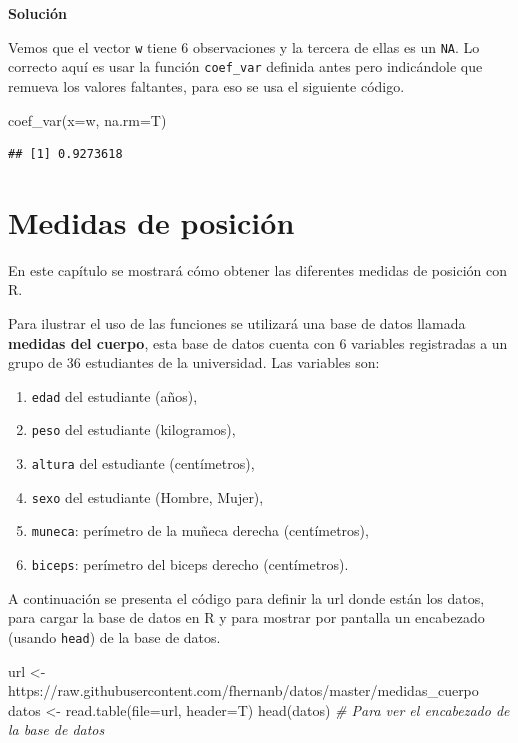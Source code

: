 \documentclass[
]{book}
\makeatletter
\newenvironment{Shaded}{\begin{snugshade}}{\end{snugshade}}
\newcommand{\AttributeTok}[1]{\textcolor[rgb]{0.77,0.63,0.00}{#1}}
\newcommand{\CommentTok}[1]{\textcolor[rgb]{0.56,0.35,0.01}{\textit{#1}}}
\newcommand{\FunctionTok}[1]{\textcolor[rgb]{0.00,0.00,0.00}{#1}}
\newcommand{\NormalTok}[1]{#1}
\newcommand{\OtherTok}[1]{\textcolor[rgb]{0.56,0.35,0.01}{#1}}
\newcommand{\StringTok}[1]{\textcolor[rgb]{0.31,0.60,0.02}{#1}}
\providecommand{\tightlist}{%
  \setlength{\itemsep}{0pt}\setlength{\parskip}{0pt}}
\newenvironment{kframe}{%
\medskip{}
\setlength{\fboxsep}{.8em}
 \def\at@end@of@kframe{}%
 \ifinner\ifhmode%
  \def\at@end@of@kframe{\end{minipage}}%
  \begin{minipage}{\columnwidth}%
 \fi\fi%
 \def\FrameCommand##1{\hskip\@totalleftmargin \hskip-\fboxsep
 \colorbox{shadecolor}{##1}\hskip-\fboxsep
     \hskip-\linewidth \hskip-\@totalleftmargin \hskip\columnwidth}%
 \MakeFramed {\advance\hsize-\width
   \@totalleftmargin\z@ \linewidth\hsize
   \@setminipage}}%
 {\par\unskip\endMakeFramed%
 \at@end@of@kframe}
\renewenvironment{Shaded}{\begin{kframe}}{\end{kframe}}
\makeatother
\begin{document}
\textbf{Solución}

Vemos que el vector \texttt{w} tiene 6 observaciones y la tercera de ellas es un \texttt{NA}. Lo correcto aquí es usar la función \texttt{coef\_var} definida antes pero indicándole que remueva los valores faltantes, para eso se usa el siguiente código.

\begin{Shaded}
\begin{Highlighting}[]
\FunctionTok{coef\_var}\NormalTok{(}\AttributeTok{x=}\NormalTok{w, }\AttributeTok{na.rm=}\NormalTok{T)}
\end{Highlighting}
\end{Shaded}

\begin{verbatim}
## [1] 0.9273618
\end{verbatim}

\hypertarget{posi}{%
\chapter{Medidas de posición}\label{posi}}

En este capítulo se mostrará cómo obtener las diferentes medidas de posición con R.

Para ilustrar el uso de las funciones se utilizará una base de datos llamada \textbf{medidas del cuerpo}, esta base de datos cuenta con 6 variables registradas a un grupo de 36 estudiantes de la universidad. Las variables son:

\begin{enumerate}
\def\labelenumi{\arabic{enumi}.}
\tightlist
\item
  \texttt{edad} del estudiante (años),
\item
  \texttt{peso} del estudiante (kilogramos),
\item
  \texttt{altura} del estudiante (centímetros),
\item
  \texttt{sexo} del estudiante (Hombre, Mujer),
\item
  \texttt{muneca}: perímetro de la muñeca derecha (centímetros),
\item
  \texttt{biceps}: perímetro del biceps derecho (centímetros).
\end{enumerate}

A continuación se presenta el código para definir la url donde están los datos, para cargar la base de datos en R y para mostrar por pantalla un encabezado (usando \texttt{head}) de la base de datos.

\begin{Shaded}
\begin{Highlighting}[]
\NormalTok{url }\OtherTok{\textless{}{-}} \StringTok{\textquotesingle{}https://raw.githubusercontent.com/fhernanb/datos/master/medidas\_cuerpo\textquotesingle{}}
\NormalTok{datos }\OtherTok{\textless{}{-}} \FunctionTok{read.table}\NormalTok{(}\AttributeTok{file=}\NormalTok{url, }\AttributeTok{header=}\NormalTok{T)}
\FunctionTok{head}\NormalTok{(datos)  }\CommentTok{\# Para ver el encabezado de la base de datos}
\end{Highlighting}
\end{Shaded}
\end{document}
